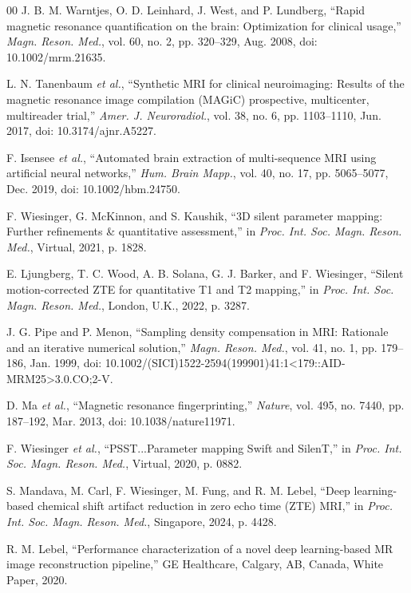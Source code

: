 \documentclass[journal,twoside,web]{ieeecolor}
\begin{document}
\begin{thebibliography}{00}
 J. B. M. Warntjes, O. D. Leinhard, J. West, and P. Lundberg, ``Rapid magnetic resonance quantification on the brain: Optimization for clinical usage,'' \emph{Magn. Reson. Med.}, vol. 60, no. 2, pp. 320--329, Aug. 2008, doi: 10.1002/mrm.21635.

 L. N. Tanenbaum \emph{et al.}, ``Synthetic MRI for clinical neuroimaging: Results of the magnetic resonance image compilation (MAGiC) prospective, multicenter, multireader trial,'' \emph{Amer. J. Neuroradiol.}, vol. 38, no. 6, pp. 1103--1110, Jun. 2017, doi: 10.3174/ajnr.A5227.

 F. Isensee \emph{et al.}, ``Automated brain extraction of multi-sequence MRI using artificial neural networks,'' \emph{Hum. Brain Mapp.}, vol. 40, no. 17, pp. 5065--5077, Dec. 2019, doi: 10.1002/hbm.24750.

 F. Wiesinger, G. McKinnon, and S. Kaushik, ``3D silent parameter mapping: Further refinements \& quantitative assessment,'' in \emph{Proc. Int. Soc. Magn. Reson. Med.}, Virtual, 2021, p. 1828.

 E. Ljungberg, T. C. Wood, A. B. Solana, G. J. Barker, and F. Wiesinger, ``Silent motion-corrected ZTE for quantitative T1 and T2 mapping,'' in \emph{Proc. Int. Soc. Magn. Reson. Med.}, London, U.K., 2022, p. 3287.

 J. G. Pipe and P. Menon, ``Sampling density compensation in MRI: Rationale and an iterative numerical solution,'' \emph{Magn. Reson. Med.}, vol. 41, no. 1, pp. 179--186, Jan. 1999, doi: 10.1002/(SICI)1522-2594(199901)41:1<179::AID-MRM25>3.0.CO;2-V.

 D. Ma \emph{et al.}, ``Magnetic resonance fingerprinting,'' \emph{Nature}, vol. 495, no. 7440, pp. 187--192, Mar. 2013, doi: 10.1038/nature11971.

 F. Wiesinger \emph{et al.}, ``PSST...Parameter mapping Swift and SilenT,'' in \emph{Proc. Int. Soc. Magn. Reson. Med.}, Virtual, 2020, p. 0882.

 S. Mandava, M. Carl, F. Wiesinger, M. Fung, and R. M. Lebel, ``Deep learning-based chemical shift artifact reduction in zero echo time (ZTE) MRI,'' in \emph{Proc. Int. Soc. Magn. Reson. Med.}, Singapore, 2024, p. 4428.

 R. M. Lebel, ``Performance characterization of a novel deep learning-based MR image reconstruction pipeline,'' GE Healthcare, Calgary, AB, Canada, White Paper, 2020.


\end{thebibliography}
\end{document}
